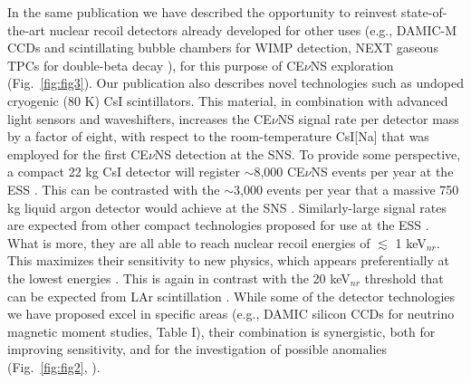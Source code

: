 In the same publication we have described the opportunity to reinvest state-of-the-art nuclear recoil detectors already developed for other uses (e.g., DAMIC-M CCDs \cite{damic1,damic2,damic3,damic4} and scintillating bubble chambers \cite{eric} for WIMP detection, NEXT gaseous TPCs for double-beta decay \cite{next1,next2,next3}), for this purpose of CE$\nu$NS exploration (Fig.\ \ref{fig:fig3}). Our publication also describes novel technologies such as undoped cryogenic (80 K) CsI scintillators. This material, in combination with advanced light sensors and waveshifters, increases the CE$\nu$NS signal rate per detector mass by a factor of eight, with respect to the room-temperature CsI[Na] that was employed for the first CE$\nu$NS detection at the SNS. To provide some perspective, a compact 22 kg  CsI detector will register $\sim$8,000 CE$\nu$NS events per year at the ESS \cite{ESS}. This can be contrasted with the $\sim$3,000 events per year that a massive 750 kg liquid argon detector would achieve at the SNS \cite{tayloe}. Similarly-large signal rates are expected from other compact technologies proposed for use at the ESS \cite{ESS}. What is more, they are all able to reach nuclear recoil energies of $\lesssim$ 1 keV$_{nr}$. This maximizes their sensitivity to new physics, which appears preferentially at the lowest energies \cite{ESS}. This is again in contrast with the 20 keV$_{nr}$ threshold that can be expected from LAr scintillation \cite{tayloe,tayloe2}. While some of the detector technologies we have proposed excel in specific areas (e.g., DAMIC silicon CCDs for neutrino magnetic moment studies, Table I), their combination is synergistic, both for improving sensitivity, and for the investigation of possible anomalies (Fig.\ \ref{fig:fig2}, \cite{ESS}).   \\



